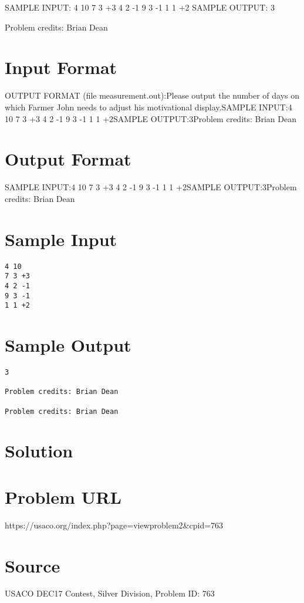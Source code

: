 \documentclass[12pt]{article}
\begin{document}
SAMPLE INPUT:
4 10
7 3 +3
4 2 -1
9 3 -1
1 1 +2
SAMPLE OUTPUT: 
3


Problem credits: Brian Dean



\section*{Input Format}
OUTPUT FORMAT (file measurement.out):Please output the number of days on which Farmer John needs to adjust his
motivational display.SAMPLE INPUT:4 10
7 3 +3
4 2 -1
9 3 -1
1 1 +2SAMPLE OUTPUT:3Problem credits: Brian Dean

\section*{Output Format}
SAMPLE INPUT:4 10
7 3 +3
4 2 -1
9 3 -1
1 1 +2SAMPLE OUTPUT:3Problem credits: Brian Dean

\section*{Sample Input}
\begin{verbatim}
4 10
7 3 +3
4 2 -1
9 3 -1
1 1 +2
\end{verbatim}

\section*{Sample Output}
\begin{verbatim}
3

Problem credits: Brian Dean

Problem credits: Brian Dean
\end{verbatim}

\section*{Solution}


\section*{Problem URL}
https://usaco.org/index.php?page=viewproblem2&cpid=763

\section*{Source}
USACO DEC17 Contest, Silver Division, Problem ID: 763
\end{document}
